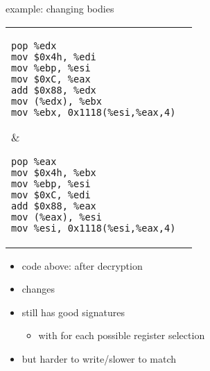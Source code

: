 
\begin{frame}[fragile,label=regSwap]{example: changing bodies}
\lstset{language=myasm,style=smaller}
\begin{tabular}{ll}
\begin{lstlisting}
pop %edx
mov $0x4h, %edi
mov %ebp, %esi
mov $0xC, %eax
add $0x88, %edx
mov (%edx), %ebx
mov %ebx, 0x1118(%esi,%eax,4)
\end{lstlisting}
&
\begin{lstlisting}
pop %eax
mov $0x4h, %ebx
mov %ebp, %esi
mov $0xC, %edi
add $0x88, %eax
mov (%eax), %esi
mov %esi, 0x1118(%esi,%eax,4)
\end{lstlisting}
\end{tabular}
\begin{itemize}
\item code above: after decryption
\item {} changes
\item still has good signatures
    \begin{itemize}
    \item with  for each possible register selection
    \end{itemize}
\item but harder to write/slower to match
\end{itemize}
\end{frame}


